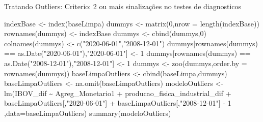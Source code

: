 \documentclass[
]{article}
\newenvironment{Shaded}{\begin{snugshade}}{\end{snugshade}}
\newcommand{\AttributeTok}[1]{\textcolor[rgb]{0.77,0.63,0.00}{#1}}
\newcommand{\DecValTok}[1]{\textcolor[rgb]{0.00,0.00,0.81}{#1}}
\newcommand{\FunctionTok}[1]{\textcolor[rgb]{0.00,0.00,0.00}{#1}}
\newcommand{\NormalTok}[1]{#1}
\newcommand{\OtherTok}[1]{\textcolor[rgb]{0.56,0.35,0.01}{#1}}
\newcommand{\SpecialCharTok}[1]{\textcolor[rgb]{0.00,0.00,0.00}{#1}}
\newcommand{\StringTok}[1]{\textcolor[rgb]{0.31,0.60,0.02}{#1}}
\begin{document}
Tratando Outliers: Criterio: 2 ou mais sinalizações no testes de
diagnosticos

\begin{Shaded}
\begin{Highlighting}[]
\NormalTok{indexBase }\OtherTok{\textless{}{-}} \FunctionTok{index}\NormalTok{(baseLimpa)}
\NormalTok{dummys }\OtherTok{\textless{}{-}} \FunctionTok{matrix}\NormalTok{(}\DecValTok{0}\NormalTok{,}\AttributeTok{nrow =} \FunctionTok{length}\NormalTok{(indexBase))}
\FunctionTok{rownames}\NormalTok{(dummys) }\OtherTok{\textless{}{-}}\NormalTok{ indexBase}
\NormalTok{dummys }\OtherTok{\textless{}{-}} \FunctionTok{cbind}\NormalTok{(dummys,}\DecValTok{0}\NormalTok{)}
\FunctionTok{colnames}\NormalTok{(dummys) }\OtherTok{\textless{}{-}} \FunctionTok{c}\NormalTok{(}\StringTok{"2020{-}06{-}01"}\NormalTok{,}\StringTok{"2008{-}12{-}01"}\NormalTok{)}
\NormalTok{dummys[}\FunctionTok{rownames}\NormalTok{(dummys) }\SpecialCharTok{==} \FunctionTok{as.Date}\NormalTok{(}\StringTok{"2020{-}06{-}01"}\NormalTok{),}\StringTok{"2020{-}06{-}01"}\NormalTok{] }\OtherTok{\textless{}{-}} \DecValTok{1}
\NormalTok{dummys[}\FunctionTok{rownames}\NormalTok{(dummys) }\SpecialCharTok{==} \FunctionTok{as.Date}\NormalTok{(}\StringTok{"2008{-}12{-}01"}\NormalTok{),}\StringTok{"2008{-}12{-}01"}\NormalTok{] }\OtherTok{\textless{}{-}} \DecValTok{1}
\NormalTok{dummys }\OtherTok{\textless{}{-}} \FunctionTok{zoo}\NormalTok{(dummys,}\AttributeTok{order.by =} \FunctionTok{rownames}\NormalTok{(dummys))}
\NormalTok{baseLimpaOutliers }\OtherTok{\textless{}{-}} \FunctionTok{cbind}\NormalTok{(baseLimpa,dummys)}
\NormalTok{baseLimpaOutliers }\OtherTok{\textless{}{-}} \FunctionTok{na.omit}\NormalTok{(baseLimpaOutliers)}
\NormalTok{modeloOutliers }\OtherTok{\textless{}{-}} \FunctionTok{lm}\NormalTok{(IBOV\_dif }\SpecialCharTok{\textasciitilde{}}\NormalTok{ Agreg\_Monetario1 }\SpecialCharTok{+}\NormalTok{ producao\_fisica\_industrial\_dif }\SpecialCharTok{+}\NormalTok{ baseLimpaOutliers[,}\StringTok{"2020{-}06{-}01"}\NormalTok{]}
  \SpecialCharTok{+}\NormalTok{ baseLimpaOutliers[,}\StringTok{"2008{-}12{-}01"}\NormalTok{] }\SpecialCharTok{{-}} \DecValTok{1}\NormalTok{ ,}\AttributeTok{data=}\NormalTok{baseLimpaOutliers)}
\FunctionTok{summary}\NormalTok{(modeloOutliers)}
\end{Highlighting}
\end{Shaded}
\end{document}
